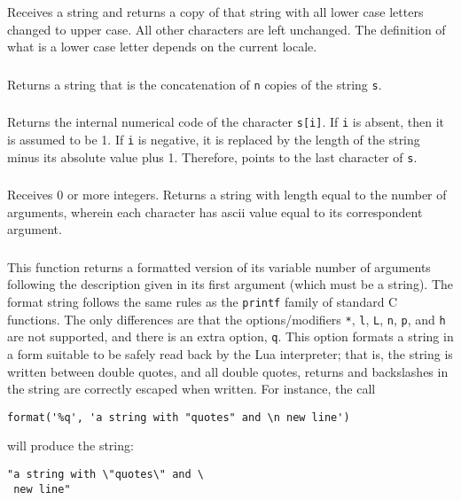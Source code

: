 \subsubsection*{\ff {}}
Receives a string and returns a copy of that string with all
lower case letters changed to upper case.
All other characters are left unchanged.
The definition of what is a lower case
letter depends on the current locale.

\subsubsection*{\ff {}}
Returns a string that is the concatenation of \verb|n| copies of
the string \verb|s|.

\subsubsection*{\ff {}}
Returns the internal numerical code of the character \verb|s[i]|.
If \verb|i| is absent, then it is assumed to be 1.
If \verb|i| is negative,
it is replaced by the length of the string minus its
absolute value plus 1.
Therefore,  points to the last character of \verb|s|.

\subsubsection*{\ff {}}
Receives 0 or more integers.
Returns a string with length equal to the number of arguments,
wherein each character has ascii value equal
to its correspondent argument.

\subsubsection*{\ff {}}
\label{format}
This function returns a formatted version of its variable number of arguments
following the description given in its first argument (which must be a string).
The format string follows the same rules as the \verb|printf| family of
standard C functions.
The only differences are that the options/modifiers
\verb|*|, \verb|l|, \verb|L|, \verb|n|, \verb|p|,
and \verb|h| are not supported,
and there is an extra option, \verb|q|.
This option formats a string in a form suitable to be safely read
back by the Lua interpreter;
that is,
the string is written between double quotes,
and all double quotes, returns and backslashes in the string
are correctly escaped when written.
For instance, the call
\begin{verbatim}
format('%q', 'a string with "quotes" and \n new line')
\end{verbatim}
will produce the string:
\begin{verbatim}
"a string with \"quotes\" and \
 new line"
\end{verbatim}

